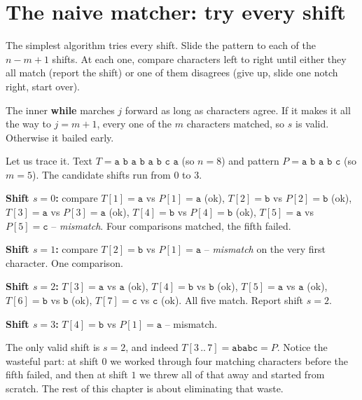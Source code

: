 \section{The naive matcher: try every shift}
\label{ch31:naive}

The simplest algorithm tries every shift. Slide the pattern to
each of the $n-m+1$ shifts. At each one, compare characters left to right until
either they all match (report the shift) or one of them disagrees (give up,
slide one notch right, start over).

\begin{algorithm}[H]
\caption{\textsc{Naive-String-Matcher}}
\end{algorithm}

The inner \textbf{while} marches $j$ forward as long as characters agree. If it
makes it all the way to $j = m+1$, every one of the $m$ characters matched, so
$s$ is valid. Otherwise it bailed early.

\begin{labbox}
Let us trace it. Text $T = \texttt{a b a b a b c a}$ (so $n=8$) and pattern
$P = \texttt{a b a b c}$ (so $m=5$). The candidate shifts run from $0$ to $3$.

\textbf{Shift $s=0$:} compare $T[1]=\texttt{a}$ vs $P[1]=\texttt{a}$ (ok),
$T[2]=\texttt{b}$ vs $P[2]=\texttt{b}$ (ok), $T[3]=\texttt{a}$ vs $P[3]=\texttt{a}$
(ok), $T[4]=\texttt{b}$ vs $P[4]=\texttt{b}$ (ok), $T[5]=\texttt{a}$ vs
$P[5]=\texttt{c}$ -- \emph{mismatch}. Four comparisons matched, the fifth failed.

\textbf{Shift $s=1$:} compare $T[2]=\texttt{b}$ vs $P[1]=\texttt{a}$ --
\emph{mismatch} on the very first character. One comparison.

\textbf{Shift $s=2$:} $T[3]=\texttt{a}$ vs $\texttt{a}$ (ok), $T[4]=\texttt{b}$
vs $\texttt{b}$ (ok), $T[5]=\texttt{a}$ vs $\texttt{a}$ (ok), $T[6]=\texttt{b}$
vs $\texttt{b}$ (ok), $T[7]=\texttt{c}$ vs $\texttt{c}$ (ok). All five match.
Report shift $s=2$.

\textbf{Shift $s=3$:} $T[4]=\texttt{b}$ vs $P[1]=\texttt{a}$ -- mismatch.

The only valid shift is $s=2$, and indeed $T[3\,..\,7]=\texttt{ababc}=P$. Notice
the wasteful part: at shift $0$ we worked through four matching characters before
the fifth failed, and then at shift $1$ we threw all of that away and started
from scratch. The rest of this chapter is about eliminating that waste.
\end{labbox}

